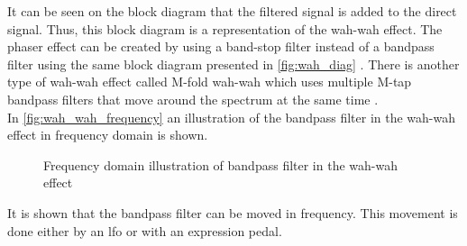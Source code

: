 It can be seen on the block diagram that the filtered signal is added to the direct signal. Thus, this block diagram is a representation of the wah-wah effect. 
The phaser effect can be created by using a band-stop filter instead of a bandpass filter using the same block diagram presented in \autoref{fig:wah_diag} \citep{wah-wah_cardiff}. 
There is another type of wah-wah effect called M-fold wah-wah which uses multiple M-tap bandpass filters that move around the spectrum at the same time \citep{wah-wah_cardiff}. \\
%
%
%
%
In \autoref{fig:wah_wah_frequency} an illustration of the bandpass filter in the wah-wah effect in frequency domain is shown. 

\begin{figure}
\centering
\def\svgwidth{\columnwidth}

\caption{Frequency domain illustration of bandpass filter in the wah-wah effect}
		\label{fig:wah_wah_frequency}
\end{figure}

It is shown that the bandpass filter can be moved in frequency. This movement is done either by an \gls{lfo} or with an expression pedal.
